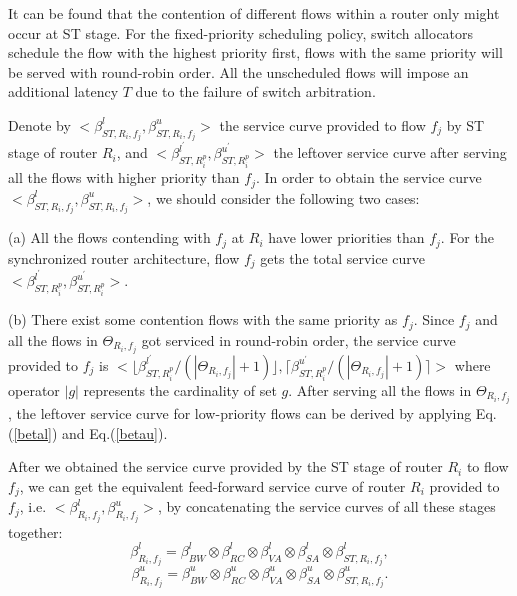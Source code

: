 \documentclass[preprint]{elsarticle}
\begin{document}
It can be found that the contention of different flows within a router only might occur at ST stage. For the fixed-priority scheduling policy, switch allocators schedule the flow with the highest priority first, flows with the same priority will be served with round-robin order. All the unscheduled flows will impose an additional latency $T$ due to the failure of switch arbitration.

Denote by $<\beta_{ST,R_i,f_j}^l,\beta_{ST,R_i,f_j}^u>$ the service curve provided to flow $f_j$ by ST stage of router $R_i$, and $<\beta_{ST,R_i^{p}}^{l^\prime},\beta_{ST,R_i^{p}}^{u^\prime}>$ the leftover service curve after serving all the flows with higher priority than $f_j$. In order to obtain the service curve $<\beta_{ST,R_i,f_j}^l,\beta_{ST,R_i,f_j}^u>$, we should consider the following two cases:

(a) All the flows contending with $f_j$ at $R_i$ have lower priorities than $f_j$. For the synchronized router architecture, flow $f_j$ gets the total service curve $<\beta_{ST,R_i^{p}}^{l^\prime},\beta_{ST,R_i^{p}}^{u^\prime}>$.

(b) There exist some contention flows with the same priority as $f_j$. Since $f_j$ and all the flows in $\Theta_{R_i,f_j}$ got serviced in round-robin order, the service curve provided to $f_j$ is $<\lfloor\beta^{l^\prime}_{ST,R_i^{p}}/(|\Theta_{R_i,f_j}|+1)\rfloor,\lceil\beta^{u^\prime}_{ST,R_i^{p}}/(|\Theta_{R_i,f_j}|+1)\rceil>$ where operator $|g|$ represents the cardinality of set $g$. After serving all the flows in $\Theta_{R_i,f_j}$, the leftover service curve for low-priority flows can be derived by applying Eq.(\ref{betal}) and Eq.(\ref{betau}).

After we obtained the service curve provided by the ST stage of router $R_i$ to flow $f_j$, we can get the equivalent feed-forward service curve of router $R_i$ provided to $f_j$, i.e. $<\beta_{R_i,f_j}^l,\beta_{R_i,f_j}^u>$, by concatenating the service curves of all these stages together:
$$\beta_{R_i,f_j}^l=\beta_{BW}^l\otimes\beta_{RC}^l\otimes\beta_{VA}^l\otimes\beta_{SA}^l\otimes \beta_{ST,R_i,f_j}^l,$$
$$\beta_{R_i,f_j}^u=\beta_{BW}^u\otimes\beta_{RC}^u\otimes\beta_{VA}^u\otimes\beta_{SA}^u\otimes \beta_{ST,R_i,f_j}^u.$$
\end{document}
